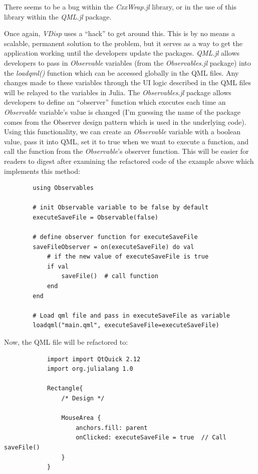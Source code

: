 \documentclass[11pt,fleqn]{article}
\newcommand{\indentpar}{\phantom{=}}
\begin{document}
        \indentpar There seems to be a bug within the \emph{CxxWrap.jl} library,
        or in the use of this library within the \emph{QML.jl} package. 

        \indentpar Once again, \emph{VDisp} uses a “hack” to get around this. This is 
        by no means a scalable, permanent solution to the problem, but it serves as a 
        way to get the application working until the developers update the packages. 
        \emph{QML.jl} allows developers to pass in \emph{Observable} variables (from 
        the \emph{Observables.jl} package) into the \emph{loadqml()} function which can 
        be accessed globally in the QML files. Any changes made to these variables through
        the UI logic described in the QML files will be relayed to the variables in Julia.
        The \emph{Observables.jl} package allows developers to define an “observer” function
        which executes each time an \emph{Observable} variable's value is changed (I'm guessing
        the name of the package comes from the Observer design pattern which is used in the 
        underlying code). Using this functionality, we can create an \emph{Observable} variable 
        with a boolean value, pass it into QML, set it to true when we want to execute a function,
        and call the function from the \emph{Observable}'s observer function. This will be easier
        for readers to digest after examining the refactored code of the example above which 
        implements this method:
        
        \begin{verbatim}
        using Observables

        # init Observable variable to be false by default
        executeSaveFile = Observable(false)
        
        # define observer function for executeSaveFile
        saveFileObserver = on(executeSaveFile) do val
            # if the new value of executeSaveFile is true
            if val
                saveFile()  # call function
            end
        end

        # Load qml file and pass in executeSaveFile as variable
        loadqml("main.qml", executeSaveFile=executeSaveFile)
        \end{verbatim}

        \indentpar Now, the QML file will be refactored to:

        \begin{verbatim}
            import import QtQuick 2.12
            import org.julialang 1.0

            Rectangle{
                /* Design */
                
                MouseArea {
                    anchors.fill: parent
                    onClicked: executeSaveFile = true  // Call saveFile()
                }
            }
        \end{verbatim}

\end{document}
